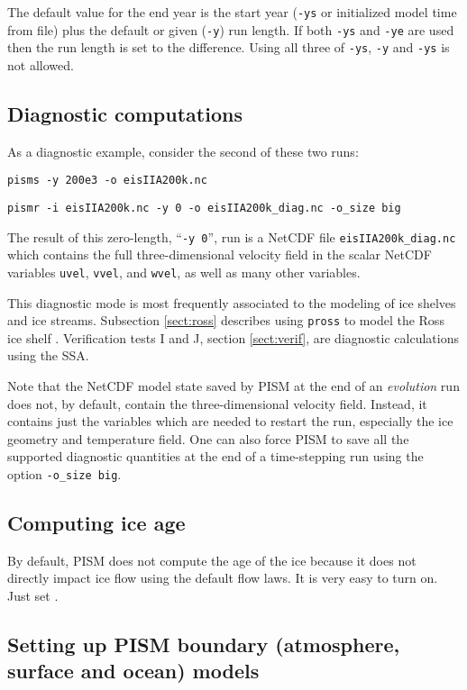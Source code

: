 The default value for the end year is the start year (\texttt{-ys} or initialized model time from file) plus the default or given (\texttt{-y}) run length.  If both \texttt{-ys} and \texttt{-ye} are used then the run length is set to the difference.  Using all three of \texttt{-ys}, \texttt{-y} and \texttt{-ys} is not allowed.


\subsection{Diagnostic computations}  As a diagnostic example, consider the second of these two runs:

\verb|pisms -y 200e3 -o eisIIA200k.nc|

\verb|pismr -i eisIIA200k.nc -y 0 -o eisIIA200k_diag.nc -o_size big|

\noindent The result of this zero-length, ``\verb|-y 0|'', run is a NetCDF file \texttt{eisIIA200k_diag.nc} which contains the full three-dimensional velocity field in the scalar NetCDF variables \texttt{uvel}, \texttt{vvel}, and \texttt{wvel}, as well as many other variables.

This diagnostic mode is most frequently associated to the modeling of ice shelves and ice streams.  Subsection \ref{sect:ross} describes using \texttt{pross} to model the Ross ice shelf \cite{MacAyealetal}.  Verification tests I and J, section \ref{sect:verif}, are diagnostic calculations using the SSA.

Note that the NetCDF model state saved by PISM at the end of an \emph{evolution} run does not, by default, contain the three-dimensional velocity field.  Instead, it contains just the variables which are needed to restart the run, especially the ice geometry and temperature field.  One can also force PISM to save all the supported diagnostic quantities at the end of a time-stepping run using the option \texttt{-o_size big}.


\subsection{Computing ice age} \label{subsect:age}

By default, PISM does not compute the age of the ice because it does not directly impact ice flow using the default flow laws.   It is very easy to turn on.  Just set .

\subsection{Setting up PISM boundary (atmosphere, surface and ocean) models}
\label{sec:boundary-models}

